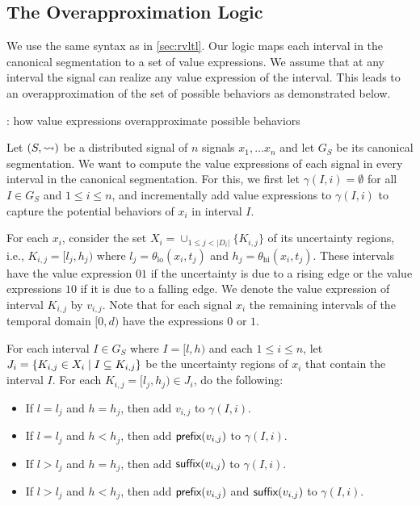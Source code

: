 \subsection{The Overapproximation Logic}
We use the same syntax as in \cref{sec:rvltl}.
Our logic maps each interval in the canonical segmentation to a set of value expressions.
We assume that at any interval the signal can realize any value expression of the interval.
This leads to an overapproximation of the set of possible behaviors as demonstrated below.

\begin{example}
	\TODO: how value expressions overapproximate possible behaviors
\end{example}

Let $(S,{\rightsquigarrow})$ be a distributed signal of $n$ signals $x_1, \ldots x_n$ and let $G_S$ be its canonical segmentation.
We want to compute the value expressions of each signal in every interval in the canonical segmentation.
For this, we first let $\gamma(I, i) = \emptyset$ for all $I \in G_S$ and $1 \leq i \leq n$, and incrementally add value expressions to $\gamma(I, i)$ to capture the potential behaviors of $x_i$ in interval $I$.

For each $x_i$, consider the set $X_i = \cup_{1 \leq j < |D_i|} \{K_{i,j}\}$ of its uncertainty regions, i.e.,  $K_{i,j} = [l_j, h_j)$ where $l_j = \theta_{\text{lo}}(x_i, t_j)$ and $h_j = \theta_{\text{hi}}(x_i, t_j)$.
These intervals have the value expression $01$ if the uncertainty is due to a rising edge or the value expressions $10$ if it is due to a falling edge.
We denote the value expression of interval $K_{i,j}$ by $v_{i,j}$.
Note that for each signal $x_i$ the remaining intervals of the temporal domain $[0,d)$ have the expressions $0$ or $1$.

For each interval $I \in G_S$ where $I = [l,h)$ and each $1 \leq i \leq n$, let $J_i = \{ K_{i,j} \in X_i \st I \subseteq K_{i,j}\}$ be the uncertainty regions of $x_i$ that contain the interval $I$.
For each $K_{i,j} = [l_j, h_j) \in J_i$, do the following:
\begin{itemize}
	\item If $l = l_j$ and $h = h_j$, then add $v_{i,j}$ to $\gamma(I, i)$.
	\item If $l = l_j$ and $h < h_j$, then add $\textsf{prefix}(v_{i,j})$ to $\gamma(I,i)$.
	\item If $l > l_j$ and $h = h_j$, then add $\textsf{suffix}(v_{i,j})$ to $\gamma(I,i)$.
	\item If $l > l_j$ and $h < h_j$, then add $\textsf{prefix}(v_{i,j})$ and $\textsf{suffix}(v_{i,j})$ to $\gamma(I,i)$.
\end{itemize}

